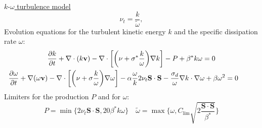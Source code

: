 \documentclass{beamer}
\begin{document}
\begin{frame}[label=ko]{\hyperlink{koSupp}{$k\text{-}\omega$ turbulence model}}
\begin{equation*}
\nu_t = \frac{k}{\tilde{\omega}}, 
\end{equation*}
Evolution equations for the turbulent kinetic energy $k$ and the specific 
dissipation 
rate $\omega$:
\begin{gather*}
\frac{\partial k}{\partial t} + \nabla \cdot (k\mathbf{v}) - \nabla \cdot
\bigg[\bigg(\nu + \sigma^*\frac{k}{\omega}\bigg) \nabla k\bigg] -P + \beta^* k 
\omega = 0\\ \hspace{-0.8cm}
\frac{\partial \omega}{\partial t} + \nabla (\omega \mathbf{v}) - 
\nabla \cdot \bigg[ \bigg( \nu + \sigma \frac{k}{\omega} \bigg) \nabla \omega 
\bigg] - \alpha \frac{\omega}{k} 2 \nu_t \mathbf{S} \cdot \mathbf{S} 
-\frac{\sigma_d}{\omega} \nabla k \cdot 
\nabla \omega+ \beta \omega^2 = 0
\end{gather*}
Limiters for the production $P$ and for $\omega$:
\begin{equation*}
P = \min \{ 2 \nu_t \mathbf{S} \cdot \mathbf{S}, 20 \beta^* k \omega \} \quad 
\tilde{\omega} = \max \Bigg\{ \omega, C_\text{lim} \sqrt{ 
2\frac{\mathbf{S}\cdot\mathbf{S}}{\beta^*}} \Bigg\}
\end{equation*}
\end{frame}
\end{document}
